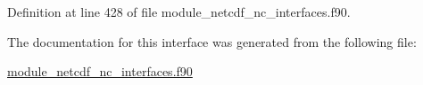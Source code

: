Definition at line 428 of file module\+\_\+netcdf\+\_\+nc\+\_\+interfaces.\+f90.



The documentation for this interface was generated from the following file\+:\begin{DoxyCompactItemize}
\item 
\hyperlink{module__netcdf__nc__interfaces_8f90}{module\+\_\+netcdf\+\_\+nc\+\_\+interfaces.\+f90}\end{DoxyCompactItemize}
